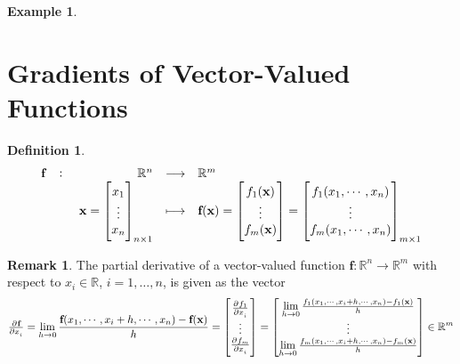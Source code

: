 \documentclass[12pt,openany]{book}
\theoremstyle{definition}
\newtheorem{definition}{Definition}[chapter]
\newtheorem{remark}{Remark}[chapter]
\newtheorem{example}{Example}[chapter]
\newcommand{\R}{\mathbb{R}}
\newcommand{\by}{\times}
\renewcommand{\vec}[1]{\textbf{#1}}
\begin{document}
\begin{example}
	
	
	
	
	
\end{example}


\section{Gradients of Vector-Valued Functions}
\begin{tcolorbox}[colframe=defcolor,title={\color{white}\bf Vector-valued Function (Vector Field)}]
	\begin{definition}
		\[
		\fullfunction{\textbf{f}}{\R^n}{\R^m}{\vec{x}=\begin{bmatrix}
				x_1\\ \vdots\\ x_n
			\end{bmatrix}_{n\by 1}}{\vec{f}(\vec{x})=\begin{bmatrix}
				f_1(\vec{x})\\ \vdots\\ f_m(\vec{x})
			\end{bmatrix}=\begin{bmatrix}
				f_1(x_1,\cdots,x_n)\\ \vdots\\f_m(x_1,\cdots,x_n)
			\end{bmatrix}_{m\by 1}}
		\]
	\end{definition}
\end{tcolorbox}
\begin{remark}
	The partial derivative of a vector-valued function $\textbf{f}:\R^n\to\R^m$ with respect to $x_i\in\R$, $i=1,\dots,n$, is given as the vector \[
	\pd{\vec{f}}{x_i}=\lim\limits_{h\to0}\frac{\vec{f}(x_1,\cdots,x_i+h,\cdots,x_n)-\vec{f}(\vec{x})}{h}=\begin{bmatrix}
		\pd{f_1}{x_i} \\ \vdots\\ \pd{f_m}{x_i}
	\end{bmatrix}=
	\begin{bmatrix}
		\lim\limits_{h\to 0}\frac{f_1(x_1,\cdots,x_i+h,\cdots,x_n)-f_1(\vec{x})}{h}\\ \vdots\\ 
		\lim\limits_{h\to 0}\frac{f_m(x_1,\cdots,x_i+h,\cdots,x_n)-f_m(\vec{x})}{h}
	\end{bmatrix}\in\R^m
	\]
\end{remark}
\vspace{20pt}
\end{document}

